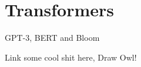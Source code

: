 \setchapterpreamble[u]{\margintoc}
\chapter{Transformers}

GPT-3, BERT and Bloom

Link some cool shit here, Draw Owl!


